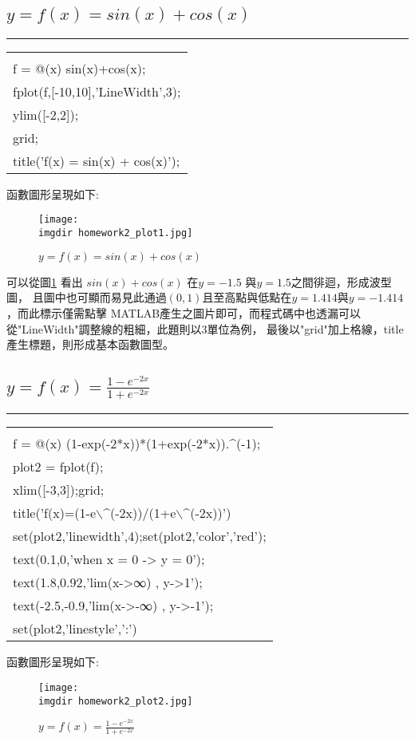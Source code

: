 		\subsection{$ y=f(x)=sin(x)+cos(x)$}
		\rule{\textwidth}{0.2pt}				
			\begin{center}\colorbox{slight}{
				\begin{tabular}{p{}}
					\MJHmarker{\textbf{MATLAB語法 :}}\\					
					f = @(x) sin(x)+cos(x);\\
					fplot(f,[-10,10],'LineWidth',3);\\
					ylim([-2,2]);\\
					grid;\\
					title('f(x) = sin(x) + cos(x)');\\					
				\end{tabular}
			}
			\end{center}			
		\bigskip
		函數圖形呈現如下:
		\begin{figure}[H]	
		 	 \centering	 			 	 
   			 \texttt{[image: \\imgdir homework2\_plot1.jpg]} 
   			 \caption{$ y=f(x)=sin(x)+cos(x)$}   		
   			 \label{plot1}   			 		 
		\end{figure}		
		可以從圖\ref{plot1} 看出 $sin(x)+cos(x)$ 在$y=-1.5$ 與$y=1.5$之間徘迴，形成波型圖，			且圖中也可顯而易見此通過$(0,1)$且至高點與低點在$y=1.414$與$y=-1.414$，而此標示僅需點擊			MATLAB產生之圖片即可，而程式碼中也透漏可以從"LineWidth"調整線的粗細，此題則以3單位為例，			最後以"grid"加上格線，title產生標題，則形成基本函數圖型。		
		\subsection{$y=f(x)=\frac{1-e^{-2x}}{1+e^{-2x}}$}
		\rule{\textwidth}{0.2pt}				
			\begin{center}\colorbox{slight}{
				\begin{tabular}{p{}}
					\MJHmarker{\textbf{MATLAB語法 :}}\\					
					f = @(x) (1-exp(-2*x))*(1+exp(-2*x)).$\^$(-1);\\
					plot2 = fplot(f);\\
					xlim([-3,3]);grid;\\					
					title('f(x)=(1-e$\backslash\^$(-2x))/(1+e$\backslash\^$(-2x))')\\
					set(plot2,'linewidth',4);set(plot2,'color','red');\\				
					text(0.1,0,'when x = 0 -> y = 0');\\
					text(1.8,0.92,'lim(x->∞) , y->1');\\
					text(-2.5,-0.9,'lim(x->-∞) , y->-1');\\
					set(plot2,'linestyle',':')\\		
				\end{tabular}
			}
			\end{center}	
		\newpage
		函數圖形呈現如下:
		\begin{figure}[H]	
		 	 \centering	 			 	 
   			 \texttt{[image: \\imgdir homework2\_plot2.jpg]} 
   			 \caption{$y=f(x)=\frac{1-e^{-2x}}{1+e^{-2x}}$}   		
   			 \label{plot2}   			 		 
		\end{figure}
		
